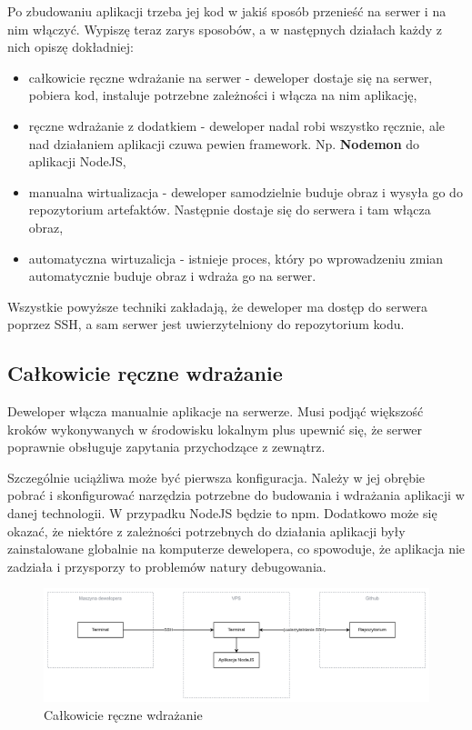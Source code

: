 \documentclass{article}
\begin{document}
Po zbudowaniu aplikacji trzeba jej kod w jakiś sposób przenieść na serwer i na nim włączyć. Wypiszę teraz zarys sposobów, a w następnych działach każdy z nich opiszę dokładniej:

\begin{itemize}
    \item całkowicie ręczne wdrażanie na serwer - deweloper dostaje się na serwer, pobiera kod, instaluje potrzebne zależności i włącza na nim aplikację,
    \item ręczne wdrażanie z dodatkiem - deweloper nadal robi wszystko ręcznie, ale nad działaniem aplikacji czuwa pewien framework. Np. \textbf{Nodemon} do aplikacji NodeJS,
    \item manualna wirtualizacja - deweloper samodzielnie buduje obraz i wysyła go do repozytorium artefaktów. Następnie dostaje się do serwera i tam włącza obraz,
    \item automatyczna wirtuzalicja - istnieje proces, który po wprowadzeniu zmian automatycznie buduje obraz i wdraża go na serwer.
\end{itemize}

Wszystkie powyższe techniki zakładają, że deweloper ma dostęp do serwera poprzez SSH, a sam serwer jest uwierzytelniony do repozytorium kodu.

\subsection{Całkowicie ręczne wdrażanie}

Deweloper włącza manualnie aplikacje na serwerze. Musi podjąć większość kroków wykonywanych w środowisku lokalnym plus upewnić się, że serwer poprawnie obsługuje zapytania przychodzące z zewnątrz.

Szczególnie uciążliwa może być pierwsza konfiguracja. Należy w jej obrębie pobrać i skonfigurować narzędzia potrzebne do budowania i wdrażania aplikacji w danej technologii. W przypadku NodeJS będzie to npm. Dodatkowo może się okazać, że niektóre z zależności potrzebnych do działania aplikacji były zainstalowane globalnie na komputerze dewelopera, co spowoduje, że aplikacja nie zadziała i przysporzy to problemów natury debugowania.

\begin{figure}[H]
    \centering
    \includegraphics[width=1\linewidth]{reczne_wdrazanie.png}
    \caption{Całkowicie ręczne wdrażanie}
    \label{fig:enter-label}
\end{figure}
\end{document}
